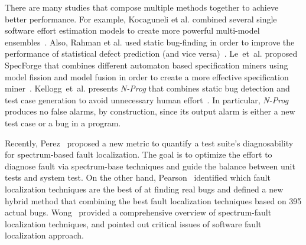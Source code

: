 There are many studies that compose multiple methods together to achieve better performance. For example, Kocaguneli et al. combined several single software effort estimation models to create more powerful multi-model ensembles~\cite{kocaguneli2012value}. Also, Rahman et al. used static bug-finding in order to improve the performance of statistical defect prediction (and vice versa)~\cite{rahman2014comparing}. Le~et~al. proposed SpecForge that combines different automaton based specification miners using  model fission and model fusion in order to create a more effective specification miner~\cite{le2015synergizing}.
Kellogg~et~al. presents \textit{N-Prog} that combines static bug detection and test case generation to avoid unnecessary human effort~\cite{Kellogg16}. In particular, \textit{N-Prog} produces no false alarms, by construction, since its output alarm is either a new test case or a bug in a program.

Recently, Perez~\cite{Perez:2017:TDM:3097368.3097446} proposed a new metric to quantify a test suite's diagnosability for spectrum-based fault localization. The goal is to optimize the effort to diagnose fault via spectrum-base techniques and guide the balance between unit tests and system test. On the other hand, Pearson~\cite{PearsonCJFAEPK2017} identified which fault localization techniques are the best of at finding real bugs and defined a new hybrid method that combining the best fault localization techniques based on 395 actual bugs. Wong~\cite{wong2016survey} provided a comprehensive overview of spectrum-fault localization techniques, and pointed out critical issues of software fault localization approach. 

